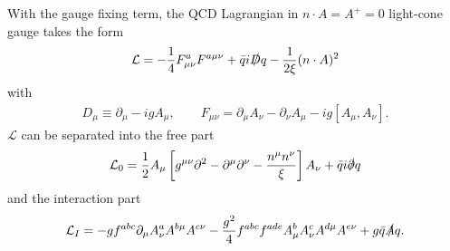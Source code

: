 \documentclass[onecolumn,showpacs,nobibnotes,nofootinbib,12pt,aps,prd,showpacs,notitlepage,nofootinbib,preprintnumbers,amsmath,amssymb]{article}
\begin{document}
With the gauge fixing term, the QCD Lagrangian in $n\cdot A=A^+=0$
light-cone gauge takes the form
\begin{align}\label{eq:L}
  \mathcal{L} = -\frac{1}{4}F^a_{\mu\nu}F^{a\mu\nu}+\bar q
  i\slashed{D} q-\frac{1}{2\xi}(n\cdot A)^2
\end{align}
with
\begin{align}
  D_\mu\equiv \partial_\mu-igA_\mu,\qquad F_{\mu\nu}=\partial_\mu
  A_\nu-\partial_\nu A_\mu-ig[A_\mu,A_\nu].
\end{align}
$\mathcal{L}$ can be separated into the free part
\begin{align}
  \mathcal{L}_0=\frac{1}{2}
  A_\mu\left[g^{\mu\nu}\partial^2-\partial^\mu\partial^\nu-\frac{n^\mu
      n^\nu}{\xi}\right]A_\nu+\bar q i\slashed{\partial} q
\end{align} and the interaction part 
\begin{align}
  \mathcal{L}_I=- gf^{abc} \partial_\mu A_\nu^a A^{b\mu}
  A^{c\nu}-\frac{g^2}{4} f^{abc} f^{ade} A_\mu^b A_\nu^c A^{d\mu}
  A^{e\nu}+g\bar q \slashed{A} q.\label{eq:LI}
\end{align}
\end{document}
